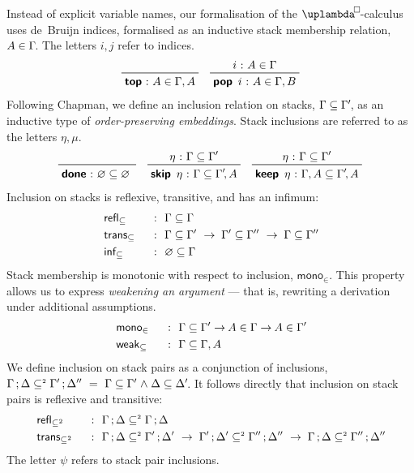 \documentclass[submission,copyright,creativecommons,sharealike,backref=page]{eptcs}
\newcommand{\uplambdabox}{\uplambda^{\mkern-3mu\Box\mkern-3mu}}
\renewcommand{\leq}{\mathrel{\subseteq}}
\newcommand{\leqII}{\mathrel{\subseteq^{\scriptscriptstyle{2}}}}
\renewcommand{\:}{\mathop{\mkern3mu:\mkern3mu}}
\renewcommand{\.}{\mathop{\mkern3mu.\mkern3mu}}
\renewcommand{\;}{\mathop{;}}
\renewcommand{\,}{\mathop{,}}
\newcommand{\conj}{\mathrel{\wedge}}
\renewcommand{\r}{\mathrel{\rightarrow\mkern-1mu}}
\newcommand{\monoin}{\operatorname{\textsf{mono}_{\in}}}
\newcommand{\infleq}{\operatorname{\textsf{inf}_{\leq}}}
\newcommand{\weakleq}{\operatorname{\textsf{weak}_{\leq}}}
\newcommand{\reflleq}{\operatorname{\textsf{refl}_{\leq}}}
\newcommand{\reflleqII}{\operatorname{\textsf{refl}_{\leqII}}}
\newcommand{\transleq}{\operatorname{\textsf{trans}_{\leq}}}
\newcommand{\transleqII}{\operatorname{\textsf{trans}_{\leqII}}}
\renewcommand{\O}{\varnothing}
\newcommand{\donel}{\operatorname{\textsf{\textbf{done}}}}
\newcommand{\keepl}{\operatorname{\textsf{\textbf{keep}}}}
\newcommand{\skipl}{\operatorname{\textsf{\textbf{skip}}}}
\newcommand{\tops}{\operatorname{\textsf{\textbf{top}}}}
\newcommand{\pops}{\operatorname{\textsf{\textbf{pop}}}}
\theoremstyle{mystyle}
\begin{document}
Instead of explicit variable names, our formalisation of the $\uplambdabox$-calculus uses de~Bruijn indices, formalised as an inductive stack membership relation, $A \in \Gamma\mkern-3mu$.  The letters $i, j$ refer to indices.
\begin{align*}
  \prftree
    {}
    {\tops \: A \in \Gamma, A}
  \quad
  \prftree
    {i \: A \in \Gamma}
    {\pops~i \: A \in \Gamma, B}
\end{align*}
Following Chapman\cite{Chapman09}, we define an inclusion relation on stacks, $\Gamma \leq \Gamma'\mkern-3mu$, as an inductive type of \emph{order-preserving embeddings}.  Stack inclusions are referred to as the letters $\eta, \mu$.
\begin{align*}
  \prftree
    {}
    {\donel \: \O \leq \O \phantom{'}}
  \quad
  \prftree
    {\eta \: \Gamma \leq \Gamma'}
    {\skipl~\eta \: \Gamma \leq \Gamma'\mkern-3mu, A}
  \quad
  \prftree
    {\eta \: \Gamma \leq \Gamma'}
    {\keepl~\eta \: \Gamma, A \leq \Gamma'\mkern-3mu, A}
\end{align*}
Inclusion on stacks is reflexive, transitive, and has an infimum:
\begin{alignat*}{2}
  & \reflleq    && ~\:~ \Gamma \leq \Gamma\\
  & \transleq   && ~\:~ \Gamma \leq \Gamma' ~\r~ \Gamma' \leq \Gamma'' ~\r~ \Gamma \leq \Gamma''\\
  & \infleq     && ~\:~ \O \leq \Gamma
\end{alignat*}
Stack membership is monotonic with respect to inclusion, $\monoin$.  This property allows us to express \emph{weakening an argument} --- that is, rewriting a derivation under additional assumptions.
\begin{alignat*}{2}
  & \monoin     && ~\:~ \Gamma \leq \Gamma' \r A \in \Gamma \r A \in \Gamma'\\
  & \weakleq    && ~\:~ \Gamma \leq \Gamma, A
\end{alignat*}
We define inclusion on stack pairs as a conjunction of inclusions, $\Gamma \; \Delta \leqII \Gamma' \; \Delta'' ~=~ \Gamma \leq \Gamma' \conj \Delta \leq \Delta'\mkern-3mu$.  It follows directly that inclusion on stack pairs is reflexive and transitive:
\begin{alignat*}{2}
  & \reflleqII  && ~\:~ \Gamma \; \Delta \leqII \Gamma \; \Delta\\
  & \transleqII && ~\:~ \Gamma \; \Delta \leqII \Gamma' \; \Delta' ~\r~ \Gamma' \; \Delta' \leqII \Gamma'' \; \Delta'' ~\r~ \Gamma \; \Delta \leqII \Gamma'' \; \Delta''
\end{alignat*}
The letter $\psi$ refers to stack pair inclusions.
\end{document}
